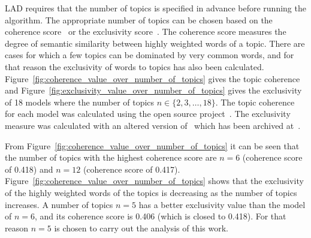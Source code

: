 \documentclass{article}
\theoremstyle{definition}
\begin{document}
LAD requires that the number of topics is specified in advance before running
the algorithm. The appropriate number of topics can be chosen based on the
coherence score~\citep{Roder2015} or the exclusivity score~\citep{Airoldi2012}. The
coherence score measures the degree of semantic similarity between highly weighted
words of a topic. There are cases for which a few topics can be dominated by very
common words, and for that reason the exclusivity of words to topics has also
been calculated.
Figure~\ref{fig:coherence_value_over_number_of_topics} gives the topic coherence
and Figure~\ref{fig:exclusivity_value_over_number_of_topics} gives the
exclusivity of 18 models where the number of topics \(n \in \{2, 3, \dots, 18\}\).
The topic coherence for each model was calculated using the
open source project~\citep{rehurek_lrec}. The exclusivity measure was calculated
with an altered version of~\citep{rehurek_lrec} which has been archived
at~\citep{gensim_nikoleta}.

From Figure~\ref{fig:coherence_value_over_number_of_topics} it can be seen that
the number of topics with the highest coherence score are $n=6$ (coherence score
of 0.418) and $n=12$ (coherence score of 0.417).
Figure~\ref{fig:coherence_value_over_number_of_topics} shows that the
exclusivity of the highly weighted words of the topics is decreasing as the number
of topics increases. A number of topics $n=5$ has a better exclusivity value
than the model of $n=6$, and its coherence score is 0.406 (which is closed to
0.418). For that reason $n=5$ is chosen to carry out the analysis of this work.
\end{document}
